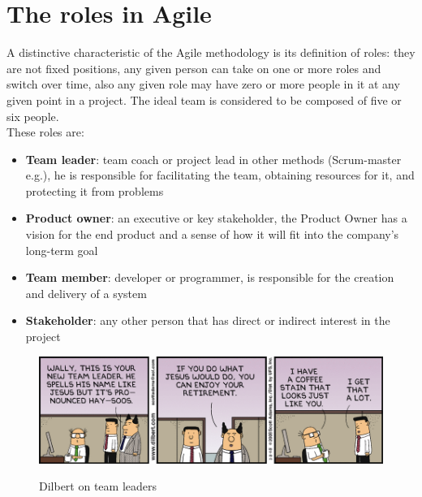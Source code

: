 \section{The roles in Agile}
	A distinctive characteristic of the Agile methodology is its definition of roles: they are not fixed positions, any given person can take on one or more roles and switch over time, also any given role may have zero or more people in it at any given point in a project\cite{agileRoles}.
	The ideal team is considered to be composed of five or six people.\\
	These roles are:
	\begin{itemize}
		\item \textbf{Team leader}: team coach or project lead in other methods (Scrum-master e.g.), he is responsible for facilitating the team, obtaining resources for it, and protecting it from problems
		\item \textbf{Product owner}: an executive or key stakeholder, the Product Owner has a vision for the end product and a sense of how it will fit into the company’s long-term goal
		\item \textbf{Team member}: developer or programmer, is responsible for the creation and delivery of a system
		\item \textbf{Stakeholder}: any other person that has direct or indirect interest in the project
	\end{itemize}
	\begin{figure}[H]
		\centering
		\includegraphics[width=\textwidth]{resources/jesus}\\
		\caption{Dilbert on team leaders}
	\end{figure}


